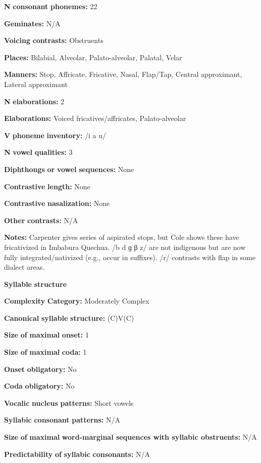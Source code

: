 \begin{styleBody}
\textbf{N} \textbf{consonant} \textbf{phonemes:} 22

\textbf{Geminates:} N/A

\textbf{Voicing} \textbf{contrasts:} Obstruents

\textbf{Places:} Bilabial, Alveolar, Palato-alveolar, Palatal, Velar

\textbf{Manners:} Stop, Affricate, Fricative, Nasal, Flap/Tap, Central approximant, Lateral approximant

\textbf{N} \textbf{elaborations:} 2

\textbf{Elaborations:} Voiced fricatives/affricates, Palato-alveolar

\textbf{V} \textbf{phoneme} \textbf{inventory:} /i a u/

\textbf{N} \textbf{vowel} \textbf{qualities:} 3

\textbf{Diphthongs} \textbf{or} \textbf{vowel} \textbf{sequences:} None

\textbf{Contrastive} \textbf{length:} None

\textbf{Contrastive} \textbf{nasalization:} None

\textbf{Other} \textbf{contrasts:} N/A

\textbf{Notes:} Carpenter gives series of aspirated stops, but Cole shows these have fricativized in Imbabura Quechua. /b d ɡ β z/ are not indigenous but are now fully integrated/nativized (e.g., occur in suffixes). /r/ contrasts with flap in some dialect areas.

\textbf{Syllable} \textbf{structure}

\textbf{Complexity} \textbf{Category:} Moderately Complex

\textbf{Canonical} \textbf{syllable} \textbf{structure:} (C)V(C) \citep[203-5]{Cole1982}

\textbf{Size} \textbf{of} \textbf{maximal} \textbf{onset:} 1

\textbf{Size} \textbf{of} \textbf{maximal} \textbf{coda:} 1

\textbf{Onset} \textbf{obligatory:} No

\textbf{Coda} \textbf{obligatory:} No

\textbf{Vocalic} \textbf{nucleus} \textbf{patterns:} Short vowels

\textbf{Syllabic} \textbf{consonant} \textbf{patterns:} N/A

\textbf{Size} \textbf{of} \textbf{maximal} \textbf{word{}-marginal sequences with syllabic obstruents:} N/A

\textbf{Predictability} \textbf{of} \textbf{syllabic} \textbf{consonants:} N/A


\end{styleBody}
